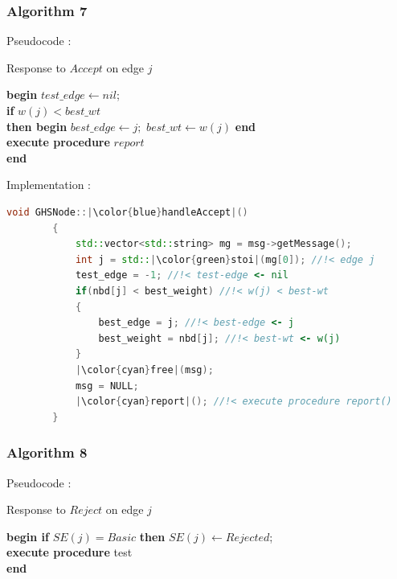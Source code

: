 \documentclass[letterpaper,11pt]{article}
\begin{document}
	\subsubsection{Algorithm 7}
	Pseudocode : \\
	
	\begin{tcolorbox}
		Response to $Accept$ on edge $j$
		\begin{algorithmic}
			\STATE \textbf{begin} $test\_edge \leftarrow nil$; \\
			{\qquad \bf if} $w(j) < best\_wt$\\ 
			{\qquad \qquad \bf then begin } $best\_edge \leftarrow j;$ $best\_wt \leftarrow w(j)$ {\bf end} \\
			{\qquad \quad \bf execute procedure } $report$ \\
			{\bf end}
		\end{algorithmic}
	\end{tcolorbox}
	
	\bigskip 
	
	Implementation : 
	
	
	\begin{lstlisting}[language=C++, caption= handleAccept()]
		void GHSNode::|\color{blue}handleAccept|()
		{
			std::vector<std::string> mg = msg->getMessage();
			int j = std::|\color{green}stoi|(mg[0]); //!< edge j
			test_edge = -1; //!< test-edge <- nil
			if(nbd[j] < best_weight) //!< w(j) < best-wt 
			{
				best_edge = j; //!< best-edge <- j
				best_weight = nbd[j]; //!< best-wt <- w(j)
			}
			|\color{cyan}free|(msg);
			msg = NULL;
			|\color{cyan}report|(); //!< execute procedure report()
		}
	\end{lstlisting}
	
	\newpage
	
	
	\subsubsection{Algorithm 8}
	Pseudocode : \\
	
	\begin{tcolorbox}
		Response to $Reject$ on edge $j$
		\begin{algorithmic}
			\STATE \textbf{begin if} $SE(j) = Basic$ \textbf{ then} $SE(j) \leftarrow Rejected$; \\
			{\quad \quad \bf execute procedure } test \\
			{\bf end}
		\end{algorithmic}
	\end{tcolorbox}
	
\end{document}
